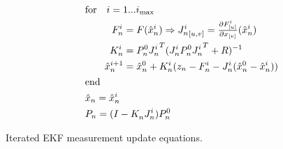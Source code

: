 % 
\begin{algorithm}[b]
\begin{align*}
&\text{for} \quad i=1... i_{\text{max}} \\
& \quad \quad
\begin{aligned}
F_n^i &= F(\hat{x}_n^i) \Rightarrow {J_n^i}_{[u, v]} = \tfrac{\partial F^i_{[u]}}{ \partial x_{[v]}}(\hat{x}_n^i) \\
K_n^i &= P_n^0 {J^i_n}^T(J_n^i P_n^0 {J^i_n}^T + R)^{-1} \\
\hat{x}_n^{i+1} &= \hat{x}_n^0 + K_n^i(z_n - F_n^i -J_n^i(\hat{x}_n^0 - \hat{x}_n^i)) \\
\end{aligned} 
\\
& \text{end} \\
& \hat{x}_n = \hat{x}_n^i \\   
& P_n = (I - K_n^\textit{\color{accent}$i$} J_n^i) P_n^0
\end{align*}
\caption{Iterated EKF measurement update equations.}
\label{tab:iekf}
\end{algorithm}

\endinput %

